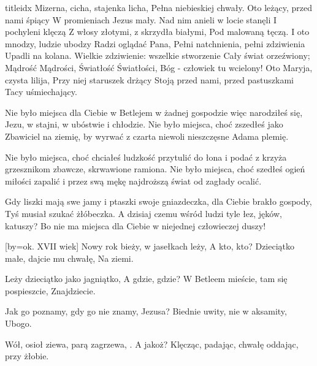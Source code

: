 \documentclass[a5paper, portrait, 12pt]{mwart}
\begin{document}
\begin{songs}{titleidx}
\beginverse
Mizerna, cicha, stajenka licha,
Pełna niebieskiej chwały.
Oto leżący, przed nami śpiący
W promieniach Jezus mały.
\endverse
\beginverse
Nad nim anieli w locie stanęli
I pochyleni klęczą
Z włosy złotymi, z skrzydła białymi,
Pod malowaną tęczą.
\endverse
\beginverse
I oto mnodzy, ludzie ubodzy
Radzi oglądać Pana,
Pełni natchnienia, pełni zdziwienia
Upadli na kolana.
\endverse
\beginverse
Wielkie zdziwienie: wszelkie stworzenie
Cały świat orzeźwiony;
Mądrość Mądrości, Światłość Światłości,
Bóg - człowiek tu wcielony!
\endverse
\beginverse
Oto Maryja, czysta lilija,
Przy niej staruszek drżący
Stoją przed nami, przed pastuszkami
Tacy uśmiechający.
\endverse
\endsong


\beginverse
Nie było miejsca dla Ciebie
w Betlejem w żadnej gospodzie
więc narodziłeś się, Jezu,
w stajni, w ubóstwie i chłodzie.
\endverse
\beginchorus
Nie było miejsca, choć zszedłeś
jako Zbawiciel na ziemię,
by wyrwać z czarta niewoli
nieszczęsne Adama plemię.
\endchorus

\beginverse
Nie było miejsca, choć chciałeś
ludzkość przytulić do łona
i podać z krzyża grzesznikom
zbawcze, skrwawione ramiona.
\endverse
\beginchorus
Nie było miejsca, choć szedłeś
ogień miłości zapalić
i przez swą mękę najdroższą
świat od zagłady ocalić.
\endchorus

\beginverse
Gdy liszki mają swe jamy
i ptaszki swoje gniazdeczka,
dla Ciebie brakło gospody,
Tyś musiał szukać żłóbeczka.
\endverse
\beginchorus
A dzisiaj czemu wśród ludzi
tyle łez, jęków, katuszy?
Bo nie ma miejsca dla Ciebie
w niejednej człowieczej duszy!
\endchorus
\endsong


[by=ok. XVII wiek]
\beginverse
Nowy rok bieży, w jasełkach leży,
A kto, kto?
\endverse
\beginchorus
Dzieciątko małe, dajcie mu chwałę,
Na ziemi.
\endchorus

\beginverse
Leży dzieciątko jako jagniątko,
A gdzie, gdzie?
\endverse
\beginchorus
W Betleem mieście, tam się pospieszcie,
Znajdziecie.
\endchorus

\beginverse
Jak go poznamy, gdy go nie znamy,
Jezusa?
\endverse
\beginchorus
Biednie uwity, nie w aksamity,
Ubogo.
\endchorus

\beginverse
Wół, osioł ziewa, parą zagrzewa, .
A jakoż?
\endverse
\beginchorus
Klęcząc, padając, chwałę oddając,
przy żłobie.
\endchorus


\end{songs}
\end{document}
